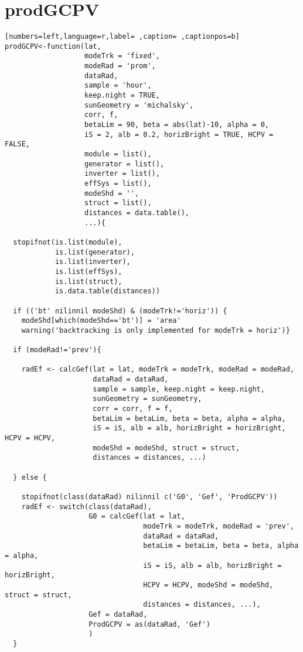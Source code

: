 \section{prodGCPV}
\label{sec:org666dfcc}
\begin{lstlisting}[numbers=left,language=r,label= ,caption= ,captionpos=b]
prodGCPV<-function(lat,
                   modeTrk = 'fixed', 
                   modeRad = 'prom',
                   dataRad,
                   sample = 'hour',
                   keep.night = TRUE,
                   sunGeometry = 'michalsky',
                   corr, f,
                   betaLim = 90, beta = abs(lat)-10, alpha = 0,
                   iS = 2, alb = 0.2, horizBright = TRUE, HCPV = FALSE,
                   module = list(), 
                   generator = list(),
                   inverter = list(), 
                   effSys = list(), 
                   modeShd = '',    
                   struct = list(), 
                   distances = data.table(),
                   ...){

  stopifnot(is.list(module),
            is.list(generator),
            is.list(inverter),
            is.list(effSys),
            is.list(struct),
            is.data.table(distances))

  if (('bt' nilinnil modeShd) & (modeTrk!='horiz')) {
    modeShd[which(modeShd=='bt')] = 'area'
    warning('backtracking is only implemented for modeTrk = horiz')}

  if (modeRad!='prev'){ 

    radEf <- calcGef(lat = lat, modeTrk = modeTrk, modeRad = modeRad,
                     dataRad = dataRad,
                     sample = sample, keep.night = keep.night,
                     sunGeometry = sunGeometry,
                     corr = corr, f = f,
                     betaLim = betaLim, beta = beta, alpha = alpha,
                     iS = iS, alb = alb, horizBright = horizBright, HCPV = HCPV,
                     modeShd = modeShd, struct = struct,
                     distances = distances, ...)

  } else { 

    stopifnot(class(dataRad) nilinnil c('G0', 'Gef', 'ProdGCPV'))
    radEf <- switch(class(dataRad),
                    G0 = calcGef(lat = lat,
                                 modeTrk = modeTrk, modeRad = 'prev',
                                 dataRad = dataRad,
                                 betaLim = betaLim, beta = beta, alpha = alpha,
                                 iS = iS, alb = alb, horizBright = horizBright,
                                 HCPV = HCPV, modeShd = modeShd, struct = struct,
                                 distances = distances, ...),
                    Gef = dataRad,
                    ProdGCPV = as(dataRad, 'Gef')
                    )
  }




\end{lstlisting}
